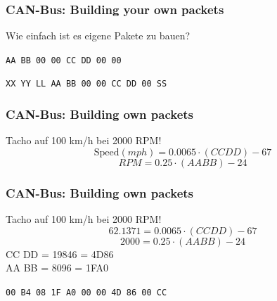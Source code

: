 \documentclass[t]{beamer}
\begin{document}
\begin{frame}
	\frametitle{CAN-Bus: Building your own packets}
    Wie einfach ist es eigene Pakete zu bauen?
    \newline
    \newline
    \newline
    \newline
    {\Large \centerline{\texttt{AA BB 00 00 CC DD 00 00}}}
    \newline
    \newline
    {\Large \centerline{\texttt{XX YY LL AA BB 00 00 CC DD 00 SS}}}
\end{frame}

\begin{frame}
	\frametitle{CAN-Bus: Building own packets}
    Tacho auf 100 km/h bei 2000 RPM!
    \newline
    \[\text{Speed} (mph) = 0.0065 \cdot (CC DD) - 67\]
    \[RPM = 0.25 \cdot (AA BB) - 24\]
\end{frame}

\begin{frame}
	\frametitle{CAN-Bus: Building own packets}
    Tacho auf 100 km/h bei 2000 RPM!
    \newline
    \[62.1371 = 0.0065 \cdot (CC DD) - 67\]
    \[2000 = 0.25 \cdot (AA BB) - 24\]
    \newline
    CC DD = 19846 = 4D86 \\
    AA BB = 8096 = 1FA0
    \newline
    \newline
    {\Large \centerline{\texttt{00 B4 08 1F A0 00 00 4D 86 00 CC}}}

\end{frame}
\end{document}
